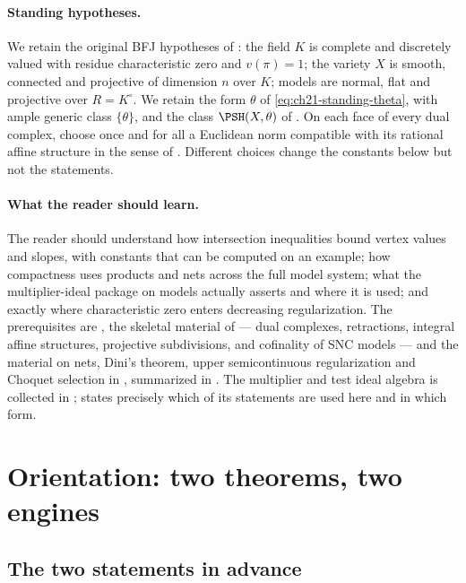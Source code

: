 \paragraph{Standing hypotheses.}
We retain the original BFJ hypotheses of : the
field $K$ is complete and discretely valued with residue characteristic
zero and $v(\pi)=1$; the variety $X$ is smooth, connected and projective
of dimension $n$ over $K$; models are normal, flat and projective over
$R=K^\circ$.  We retain the form $\theta$ of
\eqref{eq:ch21-standing-theta}, with ample generic class $\{\theta\}$, and
the class $\PSH(X,\theta)$ of .  On each face of
every dual complex, choose once and for all a Euclidean norm compatible with
its rational affine structure in the sense of
.  Different choices change the constants below but
not the statements.

\paragraph{What the reader should learn.}
The reader should understand how intersection inequalities bound vertex
values and slopes, with constants that can be computed on an example; how
compactness uses products and nets across the full model system; what
the multiplier-ideal package on models actually asserts and where it is
used; and exactly where characteristic zero enters decreasing
regularization.  The prerequisites are
, the skeletal material of
 --- dual complexes, retractions, integral affine
structures, projective subdivisions, and cofinality of SNC models --- and
the material on nets, Dini's theorem, upper semicontinuous regularization
and Choquet selection in , summarized in
.  The multiplier and test ideal algebra is collected in
;  states precisely which of its
statements are used here and in which form.

\section{Orientation: two theorems, two engines}
\label{sec:ch22-orientation}

\subsection{The two statements in advance}
\label{sec:ch22-statements-preview}

